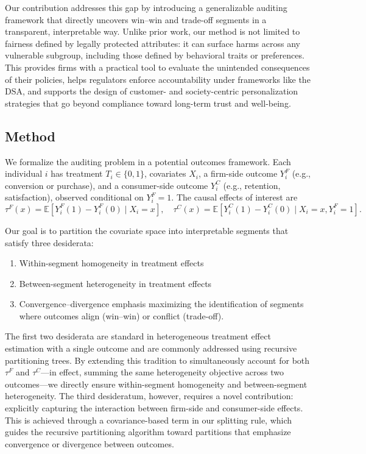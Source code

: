 \documentclass[11pt,letterpaper,english]{article}
\begin{document}
Our contribution addresses this gap by introducing a generalizable auditing framework that directly uncovers win–win and trade-off segments in a transparent, interpretable way. Unlike prior work, our method is not limited to fairness defined by legally protected attributes: it can surface harms across any vulnerable subgroup, including those defined by behavioral traits or preferences. This provides firms with a practical tool to evaluate the unintended consequences of their policies, helps regulators enforce accountability under frameworks like the DSA, and supports the design of customer- and society-centric personalization strategies that go beyond compliance toward long-term trust and well-being.

\subsection{Method}

We formalize the auditing problem in a potential outcomes framework. Each individual $i$ has treatment $T_i \in \{0,1\}$, covariates $X_i$, a firm-side outcome $Y_i^F$ (e.g., conversion or purchase), and a consumer-side outcome $Y_i^C$ (e.g., retention, satisfaction), observed conditional on $Y_i^F=1$. The causal effects of interest are
\[
\tau^F(x) = \mathbb{E}[Y_i^F(1)-Y_i^F(0)\mid X_i=x], \quad
\tau^C(x) = \mathbb{E}[Y_i^C(1)-Y_i^C(0)\mid X_i=x, Y_i^F=1].
\]

Our goal is to partition the covariate space into interpretable segments that satisfy three desiderata:
\begin{enumerate}
    \item Within-segment homogeneity in treatment effects
    \item Between-segment heterogeneity in treatment effects
    \item Convergence--divergence emphasis maximizing the identification of segments where outcomes align (win--win) or conflict (trade-off).
\end{enumerate}

The first two desiderata are standard in heterogeneous treatment effect estimation with a single outcome and are commonly addressed using recursive partitioning trees. By extending this tradition to simultaneously account for both $\tau^F$ and $\tau^C$---in effect, summing the same heterogeneity objective across two outcomes---we directly ensure within-segment homogeneity and between-segment heterogeneity. The third desideratum, however, requires a novel contribution: explicitly capturing the interaction between firm-side and consumer-side effects. This is achieved through a covariance-based term in our splitting rule, which guides the recursive partitioning algorithm toward partitions that emphasize convergence or divergence between outcomes.
\end{document}
